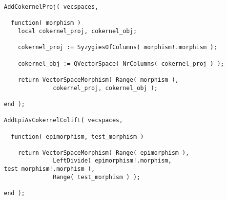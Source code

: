 \begin{small}
\begin{Verbatim}[frame=single]
AddCokernelProj( vecspaces,

  function( morphism )
    local cokernel_proj, cokernel_obj;

    cokernel_proj := SyzygiesOfColumns( morphism!.morphism );

    cokernel_obj := QVectorSpace( NrColumns( cokernel_proj ) );

    return VectorSpaceMorphism( Range( morphism ), 
              cokernel_proj, cokernel_obj );

end );

AddEpiAsCokernelColift( vecspaces,
  
  function( epimorphism, test_morphism )
    
    return VectorSpaceMorphism( Range( epimorphism ),
              LeftDivide( epimorphism!.morphism, test_morphism!.morphism ),
              Range( test_morphism ) );
    
end );
\end{Verbatim}
\end{small}